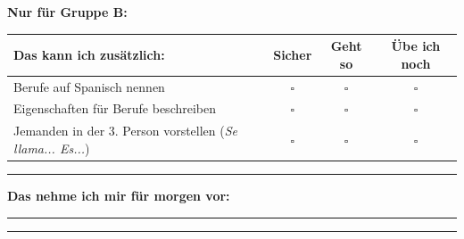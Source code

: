 \documentclass[11pt, a4paper]{article}
\begin{document}
\vspace{0.8cm}

\begin{center}
{\large\bfseries Nur für Gruppe B:}
\end{center}

\vspace{0.3cm}

\begin{tabularx}{\textwidth}{|X|c|c|c|}
\hline
\rowcolor{spanisch!10}
\textbf{Das kann ich zusätzlich:} & \textbf{Sicher} & \textbf{Geht so} & \textbf{Übe ich noch} \\
\hline
Berufe auf Spanisch nennen & $\square$ & $\square$ & $\square$ \\
\hline
Eigenschaften für Berufe beschreiben & $\square$ & $\square$ & $\square$ \\
\hline
Jemanden in der 3. Person vorstellen (\textit{Se llama... Es...}) & $\square$ & $\square$ & $\square$ \\
\hline
\end{tabularx}

\vspace{1cm}

\hrule
\vspace{0.5cm}

\begin{center}
{\large\bfseries Das nehme ich mir für morgen vor:}
\end{center}

\vspace{0.3cm}

\rule{\textwidth}{0.4pt}

\vspace{0.8cm}

\rule{\textwidth}{0.4pt}

\vspace{1cm}

\begin{center}
\end{center}
\end{document}
